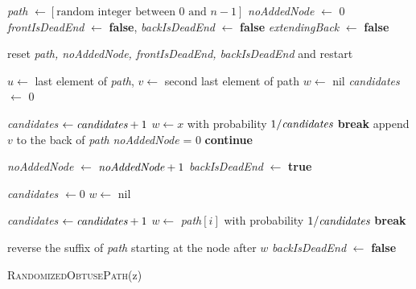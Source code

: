 \documentclass[a4paper, 10pt, ngerman]{article}
\begin{document}
\begin{algorithm}
    \emph{path} $\gets [\text{random integer between 0 and $n - 1$}]$ \; 
    \emph{noAddedNode} $\gets$ 0 \;
    \emph{frontIsDeadEnd} $\gets$ \textbf{false}, \emph{backIsDeadEnd}  $\gets$ \textbf{false}\;
    \emph{extendingBack} $\gets$ \textbf{false}

    {
        {
            reset \emph{path, noAddedNode, frontIsDeadEnd, backIsDeadEnd} and restart \;
        }

        {
        $u \gets$ last element of \emph{path}, $v \gets$ second last element of path \;
        $w \gets$ nil \;
        \emph{candidates} $\gets$ 0 \;

        {
            {
                \emph{candidates} $\gets \emph{candidates} + 1$ \;
                $w \gets x$ with probability $1 / \emph{candidates}$ \;
                {
                    \textbf{break} \;
                }
            }
        }
        {
            append $v$ to the back of \emph{path} \;
            \emph{noAddedNode} = 0 \;
            \textbf{continue} \;
        }

        \emph{noAddedNode} $\gets$ $\emph{noAddedNode} + 1$ \;
        \emph{backIsDeadEnd} $\gets$ \textbf{true} \;

        {
            \emph{candidates} $\gets 0$ \;
            $w \gets$ nil \;

            {
                {
                    \emph{candidates} $\gets \emph{candidates} + 1$ \;
                    $w \gets$ \emph{path}$[i]$ with probability $1 / \emph{candidates}$ \;
                    {
                        \textbf{break} \;
                    }
                }
            }

            {
                reverse the suffix of \emph{path} starting at the node after $w$ \;
                \emph{backIsDeadEnd} $\gets$ \textbf{false} \;
            } 
        } }

    }


    \caption{\textsc{RandomizedObtusePath}(z)}
\end{algorithm}
\end{document}
